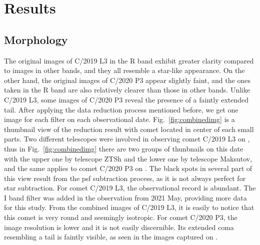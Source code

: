 \section{Results} \label{sec:res}

\subsection{Morphology}

The original images of C/2019 L3 in the R band exhibit greater clarity compared to images in other bands, and they all resemble a star-like appearance. On the other hand, the original images of C/2020 P3 appear slightly faint, and the ones taken in the R band are also relatively clearer than those in other bands. Unlike C/2019 L3, some images of C/2020 P3 reveal the presence of a faintly extended tail. After applying the data reduction process mentioned before, we get one image for each filter on each observational date. Fig.~\ref{fig:combinedimg} is a thumbnail view of the reduction result with comet located in center of each small parts. Two different telescopes were involved in observing comet C/2019 L3 on , thus in Fig.~\ref{fig:combinedimg} there are two groups of thunbnails on this date with the upper one by telescope ZTSh and the lower one by telescope Maksutov, and the same applies to comet C/2020 P3 on . The black spots in several part of this view result from the psf subtraction process, as it is not always perfect for star subtraction. For comet C/2019 L3, the observational record is abundant. The I band filter was added in the observation from 2021 May, providing more data for this study. From the combined images of C/2019 L3, it is easily to notice that this comet is very round and seemingly isotropic. For comet C/2020 P3, the image resolution is lower and it is not easily discernible. Its extended coma resembling a tail is faintly visible, as seen in the images captured on . 



